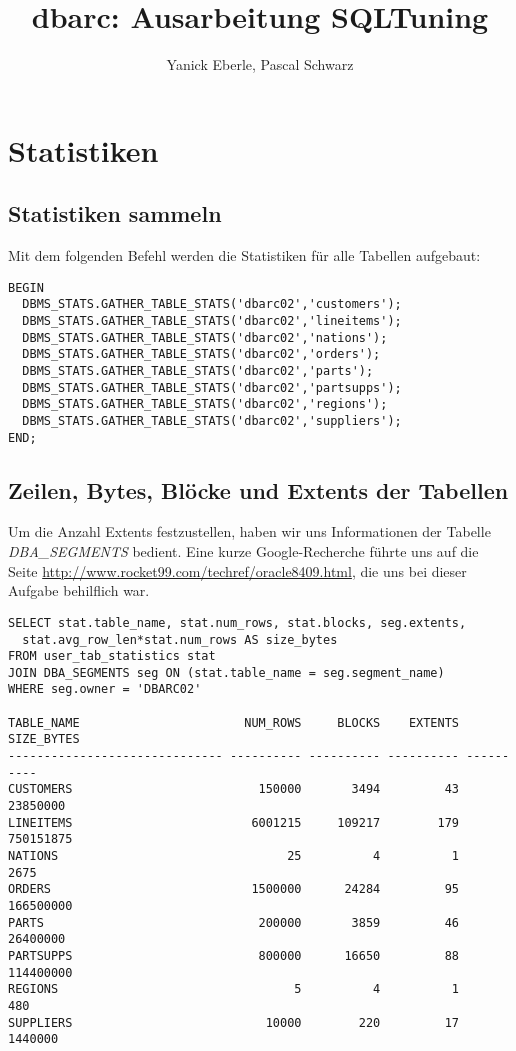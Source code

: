 \documentclass[11pt,a4paper,parskip=half]{scrartcl}
\title{dbarc: Ausarbeitung SQLTuning}
\author{Yanick Eberle, Pascal Schwarz}
\begin{document}
\maketitle
\vfill
\tableofcontents

\pagestyle{fancy}
\section{Statistiken}
\subsection{Statistiken sammeln}
Mit dem folgenden Befehl werden die Statistiken für alle Tabellen aufgebaut:
\begin{lstlisting}
BEGIN
  DBMS_STATS.GATHER_TABLE_STATS('dbarc02','customers');
  DBMS_STATS.GATHER_TABLE_STATS('dbarc02','lineitems');
  DBMS_STATS.GATHER_TABLE_STATS('dbarc02','nations');
  DBMS_STATS.GATHER_TABLE_STATS('dbarc02','orders');
  DBMS_STATS.GATHER_TABLE_STATS('dbarc02','parts');
  DBMS_STATS.GATHER_TABLE_STATS('dbarc02','partsupps');
  DBMS_STATS.GATHER_TABLE_STATS('dbarc02','regions');
  DBMS_STATS.GATHER_TABLE_STATS('dbarc02','suppliers');
END;
\end{lstlisting}

\subsection{Zeilen, Bytes, Blöcke und Extents der Tabellen}
Um die Anzahl Extents festzustellen, haben wir uns Informationen der Tabelle \emph{DBA\_SEGMENTS} bedient. Eine kurze Google-Recherche führte uns auf die Seite \url{http://www.rocket99.com/techref/oracle8409.html}, die uns bei dieser Aufgabe behilflich war.

\begin{lstlisting}
SELECT stat.table_name, stat.num_rows, stat.blocks, seg.extents,
  stat.avg_row_len*stat.num_rows AS size_bytes
FROM user_tab_statistics stat
JOIN DBA_SEGMENTS seg ON (stat.table_name = seg.segment_name)
WHERE seg.owner = 'DBARC02'

TABLE_NAME                       NUM_ROWS     BLOCKS    EXTENTS SIZE_BYTES
------------------------------ ---------- ---------- ---------- ----------
CUSTOMERS                          150000       3494         43   23850000 
LINEITEMS                         6001215     109217        179  750151875 
NATIONS                                25          4          1       2675 
ORDERS                            1500000      24284         95  166500000 
PARTS                              200000       3859         46   26400000 
PARTSUPPS                          800000      16650         88  114400000 
REGIONS                                 5          4          1        480 
SUPPLIERS                           10000        220         17    1440000 
\end{lstlisting}
\end{document}
